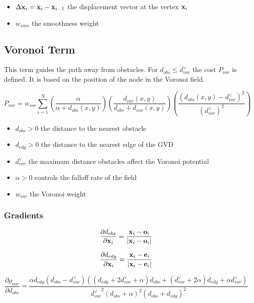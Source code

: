 \begin{itemize}
\item $\Delta\mathbf{x}_i = \mathbf{x}_i - \mathbf{x}_{i-1}$ the displacement vector at the vertex $\mathbf{x}_i$
\item $w_{smo}$ the smoothness weight
\end{itemize}

\subsection{Voronoi Term}
This term guides the path away from obstacles. For $d_{obs} \leq d_{vor}^{\lor}$ the cost $P_{vor}$ is defined. It is based on the position of the node in the Voronoi field.

\begin{equation}
P_{vor} = w_{vor} \displaystyle\sum_{i=1}^{N} \left(\frac{\alpha}{\alpha + d_{obs}(x,y)}\right)\left(\frac{d_{vor}(x,y)}{d_{obs} + d_{vor}(x,y)}\right)\left(\frac{(d_{obs}(x,y) - d_{vor}^{\lor})^2}{(d_{vor}^{\lor})^2}\right)
\end{equation}

\begin{itemize}
\item $d_{obs} > 0$ the distance to the nearest obstacle
\item $d_{edg} > 0$ the distance to the nearest edge of the GVD
\item $d_{vor}^{\lor}$ the maximum distance obstacles affect the Voronoi potential
\item $\alpha > 0$ controls the falloff rate of the field
\item $w_{vor}$ the Voronoi weight
\end{itemize}

\subsubsection{Gradients}

\begin{equation}
\frac{\partial d_{obs}}{\partial \mathbf{x}_i} = \frac{\mathbf{x}_i-\mathbf{o}_i}{|\mathbf{x}_i-\mathbf{o}_i|}
\end{equation}

\begin{equation}
\frac{\partial d_{edg}}{\partial \mathbf{x}_i} =\frac{\mathbf{x}_i-\mathbf{e}_i}{|\mathbf{x}_i-\mathbf{e}_i|}
\end{equation}

\begin{equation}
\frac{\partial\rho_{vor}}{\partial d_{obs}} = \frac{\alpha d_{edg}\left(d_{obs}-d_{vor}^{\lor}\right)\left(\left(d_{edg}+2d_{vor}^{\lor}+\alpha\right) d_{obs}+\left(d_{vor}^{\lor}+2\alpha\right)d_{edg}+\alpha d_{vor}^{\lor}\right)}{{d_{vor}^{\lor}}^2\left(d_{obs}+\alpha\right)^2\left(d_{obs}+d_{edg}\right)^2}
\end{equation}


